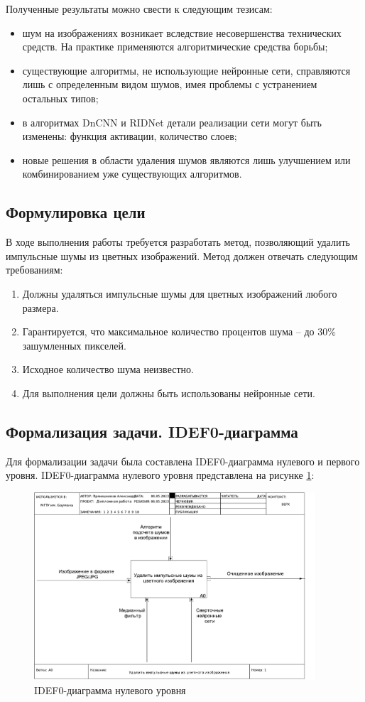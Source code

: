 Полученные результаты можно свести к следующим тезисам:
\begin{itemize}
	\item шум на изображениях возникает вследствие несовершенства технических средств. На практике применяются алгоритмические средства борьбы;
	\item существующие алгоритмы, не использующие нейронные сети, справляются лишь с определенным видом шумов, имея проблемы с устранением остальных типов;
	\item в алгоритмах DnCNN и RIDNet детали реализации сети могут быть изменены: функция активации, количество слоев;
	\item новые решения в области удаления шумов являются лишь улучшением или комбинированием уже существующих алгоритмов.
\end{itemize}

\subsection{Формулировка цели}
В ходе выполнения работы требуется разработать метод, позволяющий удалить импульсные шумы из цветных изображений. 
Метод должен отвечать следующим требованиям:
\begin{enumerate}
	\item Должны удаляться импульсные шумы для цветных изображений любого размера.
	\item Гарантируется, что максимальное количество процентов шума -- до 30\% зашумленных пикселей.
	\item Исходное количество шума неизвестно.
	\item Для выполнения цели должны быть использованы нейронные сети.
\end{enumerate}

\newpage
\subsection{Формализация задачи. IDEF0-диаграмма}
Для формализации задачи была составлена IDEF0-диаграмма нулевого и первого уровня. 
IDEF0-диаграмма нулевого уровня представлена на рисунке \ref{idef0::0}:

\FloatBarrier
\begin{figure}[h]	
	\begin{center}
		\includegraphics[height=7cm]{inc/pdf/01_A0.pdf}
	\end{center}
	\captionsetup{justification=centering}
	\caption{IDEF0-диаграмма нулевого уровня}
	\label{idef0::0}
\end{figure}
\FloatBarrier

